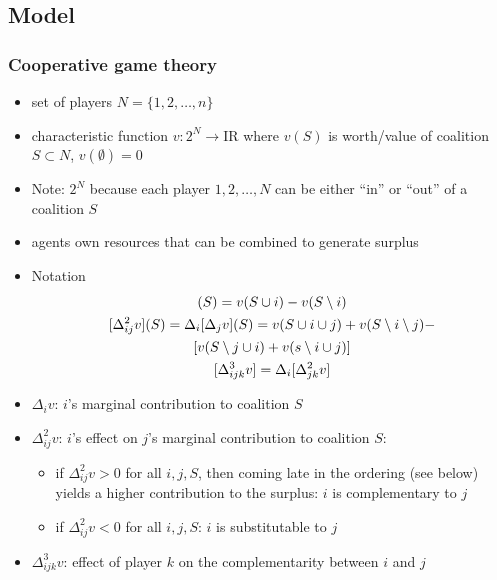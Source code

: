 \documentclass[11pt,english]{beamer}
\newcommand{\re}{\mbox{I}\!\mbox{R}}
\begin{document}
\subsection{Model}

\begin{frame}[allowframebreaks]\frametitle{Cooperative game theory}
  \begin{itemize}
  \item set of players $N = \{1,2,\ldots,n\}$\\
  \item characteristic function $v:2^N \rightarrow \re$ where $v(S)$
    is worth/value of coalition $S \subset N$, $v(\emptyset) =0$
  \item Note: $2^N$ because each player $1,2,\ldots,N$ can be either
    ``in'' or ``out'' of a coalition $S$
  \item agents own resources that can be combined to generate surplus\\
  \item Notation
    \begin{gather}
      [\Delta_i v](S) = v(S \cup i) - v(S \setminus i) \\
      [\Delta^2_{ij} v](S) = \Delta_i[\Delta_j v](S) = v(S \cup i \cup
      j) +v(S \setminus i \setminus j) -\notag \\ [v(S \setminus j \cup i) +
      v(s \setminus i \cup j)]
      \\
      [\Delta^3_{ijk} v] = \Delta_i[\Delta^2_{jk} v]
    \end{gather}
  \item $\Delta_i v$: $i$'s marginal contribution to coalition $S$\\
  \item $\Delta^2_{ij} v$: $i$'s effect on $j$'s marginal contribution
    to coalition $S$:
    \begin{itemize}
    \item if $\Delta^2_{ij} v > 0$ for all $i,j,S$, then coming late
      in the ordering (see below) yields a higher contribution to the surplus:
      $i$ is complementary to $j$
    \item if $\Delta^2_{ij} v < 0$ for all $i,j,S$: $i$ is
      substitutable to $j$
    \end{itemize} %
  \item $\Delta^3_{ijk} v$: effect of player $k$ on the complementarity between $i$ and $j$
  \end{itemize} %
\end{frame}
\end{document}
